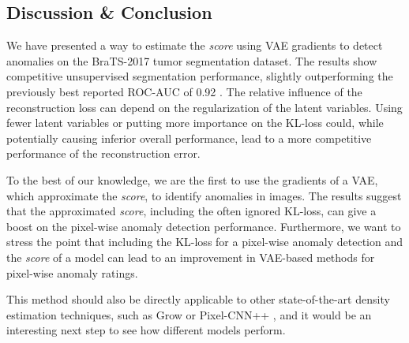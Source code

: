\documentclass{article}
\begin{document}
\subsection{Discussion \& Conclusion}

We have presented a way to estimate the \textit{score} using VAE gradients to detect anomalies on the BraTS-2017 tumor segmentation dataset. The results show competitive unsupervised segmentation performance, slightly outperforming the previously best reported ROC-AUC of 0.92 \cite{chen_unsupervised_2018,chen_deep_2018}.
The relative influence of the reconstruction loss can depend on the regularization of the latent variables. Using fewer latent variables or putting more importance on the KL-loss could, while potentially causing inferior overall performance, lead to a more competitive performance of the reconstruction error.


To the best of our knowledge, we are the first to use the gradients of a VAE, which approximate the  \textit{score}, to identify anomalies in images. 
The results suggest that the approximated \textit{score}, including the often ignored KL-loss, can give a boost on the pixel-wise anomaly detection performance. Furthermore, we want to stress the point that including the KL-loss for a pixel-wise anomaly detection and the \textit{score} of a model can lead to an improvement in VAE-based methods for pixel-wise anomaly ratings.

This method should also be directly applicable to other state-of-the-art density estimation techniques, such as Grow \cite{kingma_glow:_2018} or Pixel-CNN++ \cite{salimans_pixel_2017}, and it would be an interesting next step to see how different models perform.
\end{document}
